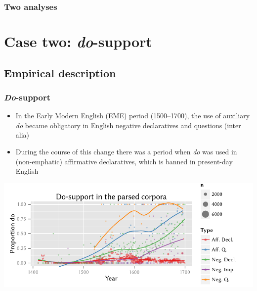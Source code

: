 \documentclass{digs-slides}
\newcommand{\includegraph}[2][]{\mode<beamer>{\texttt{[image: \#2]}}
    \mode<handout>{\texttt{[image: \#2]}}}
\begin{document}
\begin{frame}
    \frametitle{Two analyses}
    \begin{multicols}{2}
        \includegraph[width=\linewidth]{figures/ne-not2}
        \includegraph[width=\linewidth]{figures/patch2}
    \end{multicols}
\end{frame}

\section{Case two: \emph{do}-support}
\label{sec:case-two:-emphdo}

\subsection{Empirical description}
\label{sec:empir-descr}

\begin{frame}
    \frametitle{\emph{Do}-support}
    \begin{itemize}
      \item In the Early Modern English (EME) period (1500–1700),
        the use of auxiliary \emph{do} became obligatory in English
        negative declaratives and questions (inter alia)
      \item During the course of this change there was a period when
        \emph{do} was used in (non-emphatic) affirmative declaratives,
        which is banned in present-day English
    \end{itemize}
    \includegraphics[width=\textwidth]{static-figures/do-all}
\end{frame}
\end{document}
